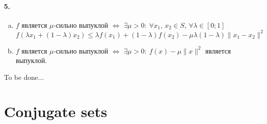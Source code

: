 \documentclass{article}
\begin{document}
\paragraph{5.}
\begin{enumerate}[(a)]
    \item $f$ является $\mu$-сильно выпуклой $\iff$ $ \exists \mu > 0 :\: \forall x_1,\, x_2 \in S,\, \forall \lambda \in [0; 1] $ 
        \[ f(\lambda x_1 + (1 - \lambda) x_2) \leqslant \lambda f(x_1) + (1 - \lambda) f(x_2) - \mu\lambda(1 - \lambda) \| x_1 - x_2 \|^2 \]
    \item $f$ является $\mu$-сильно выпуклой $\iff$ $ \exists \mu > 0 :\: f(x) - \mu\|x\|^2 $ является выпуклой.
\end{enumerate}
To be done...


\section*{Conjugate sets}
\end{document}
